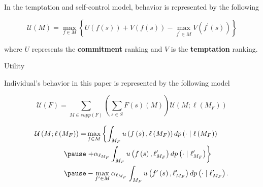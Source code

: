 \documentclass[usenames,dvipsnames,aspectratio=169,11pt, envcountsect, handout]{beamer}
\begin{document}
\begin{frame}{\cite{gulTemptationSelfControl2001}}

	In the temptation and self-control model, behavior is represented by the following

	\vfill

	\[
		\mathcal{U} \left( M \right) = \max_{f \in M} \left\{ U \left( f \left( s \right) \right) + V \left( f \left( s \right) \right) - \max_{f^{\prime} \in M} V \left( f^{\prime} \left( s \right) \right) \right\}
	\]

	\vfill

	where \( U \) represents the \textbf{commitment} ranking and \( V \) is the \textbf{temptation} ranking.

\end{frame}

\begin{frame}{Utility}

	Individual's behavior in this paper is represented by the following model

	\vfill

	\begin{equation}\label{eq:contmenu1}
		\mathscr{U}(F)= \sum_{M \in supp \left( F \right)} \left( \sum_{s \in S} F\left( s \right) \left( M \right) \right) \mathcal{U} \left(M ; \ell \left( M_{F} \right) \right)
	\end{equation} \pause

	\vfill

	\begin{equation}\label{eq:menu1}
		\begin{aligned}
			\mathcal{U} \left(M ; \ell \left( M_{F} \right) \right) = & \max _{f \in M}\left\{\int_{M_F} u \left( f \left( s \right), \ell \left( M_{F} \right) \right) d p\left(\cdot \mid \ell \left(M_F \right) \right) \right.                \\ \pause
			                                                          & \left. +\alpha _{\ell_{M_F}} \int_{M_F} u \left( f \left(s \right) ,  \ell^{\prime}_{M_F} \right) d p\left(\cdot \mid \ell^{\prime}_{M_F} \right)\right\}                 \\ \pause
			                                                          & -\max _{f^{\prime} \in M} \alpha _{\ell_{M_F}} \int_{M_F} u\left(f^{\prime}\left(s \right) , \ell^{\prime}_{M_F} \right) d p\left(\cdot \mid \ell^{\prime}_{M_F}\right) .
		\end{aligned}
	\end{equation}

\end{frame}
\end{document}

